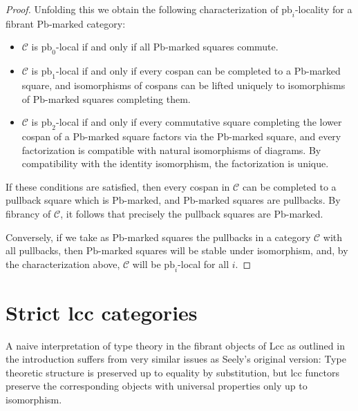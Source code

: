 \documentclass[a4paper]{article}
\theoremstyle{remark}
\theoremstyle{definition}
\begin{document}
\begin{proof}
  Unfolding this we obtain the following characterization of $\mathrm{pb}_i$-locality for a fibrant $\mathrm{Pb}$-marked category:
  \begin{itemize}
    \item
      $\mathcal{C}$ is $\mathrm{pb}_0$-local if and only if all $\mathrm{Pb}$-marked squares commute.
    \item
      $\mathcal{C}$ is $\mathrm{pb}_1$-local if and only if every cospan can be completed to a $\mathrm{Pb}$-marked square, and isomorphisms of cospans can be lifted uniquely to isomorphisms of $\mathrm{Pb}$-marked squares completing them.
    \item
      $\mathcal{C}$ is $\mathrm{pb}_2$-local if and only if every commutative square completing the lower cospan of a $\mathrm{Pb}$-marked square factors via the $\mathrm{Pb}$-marked square, and every factorization is compatible with natural isomorphisms of diagrams.
      By compatibility with the identity isomorphism, the factorization is unique.
  \end{itemize}
  If these conditions are satisfied, then every cospan in $\mathcal{C}$ can be completed to a pullback square which is $\mathrm{Pb}$-marked, and $\mathrm{Pb}$-marked squares are pullbacks.
  By fibrancy of $\mathcal{C}$, it follows that precisely the pullback squares are $\mathrm{Pb}$-marked.

  Conversely, if we take as $\mathrm{Pb}$-marked squares the pullbacks in a category $\mathcal{C}$ with all pullbacks, then $\mathrm{Pb}$-marked squares will be stable under isomorphism, and, by the characterization above, $\mathcal{C}$ will be $\mathrm{pb}_i$-local for all $i$.
\end{proof}

\section{Strict lcc categories}
\label{sec:slcc}

A naive interpretation of type theory in the fibrant objects of $\mathrm{Lcc}$ as outlined in the introduction suffers from very similar issues as Seely's original version:
Type theoretic structure is preserved up to equality by substitution, but lcc functors preserve the corresponding objects with universal properties only up to isomorphism.
\end{document}
